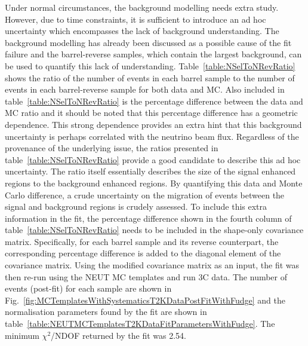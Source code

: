 \newline
\newline
Under normal circumstances, the background modelling needs extra study.  However, due to time constraints, it is sufficient to introduce an ad hoc uncertainty which encompasses the lack of background understanding.  The background modelling has already been discussed as a possible cause of the fit failure and the barrel-reverse samples, which contain the largest background, can be used to quantify this lack of understanding.  Table~\ref{table:NSelToNRevRatio} shows the ratio of the number of events in each barrel sample to the number of events in each barrel-reverse sample for both data and MC.  Also included in table~\ref{table:NSelToNRevRatio} is the percentage difference between the data and MC ratio and it should be noted that this percentage difference has a geometric dependence.  This strong dependence provides an extra hint that this background uncertainty is perhaps correlated with the neutrino beam flux.  Regardless of the provenance of the underlying issue, the ratios presented in table~\ref{table:NSelToNRevRatio} provide a good candidate to describe this ad hoc uncertainty.  The ratio itself essentially describes the size of the signal enhanced regions to the background enhanced regions.  By quantifying this data and Monte Carlo difference, a crude uncertainty on the migration of events between the signal and background regions is crudely assessed.  To include this extra information in the fit, the percentage difference shown in the fourth column of table~\ref{table:NSelToNRevRatio} needs to be included in the shape-only covariance matrix.  Specifically, for each barrel sample and its reverse counterpart, the corresponding percentage difference is added to the diagonal element of the covariance matrix.  Using the modified covariance matrix as an input, the fit was then re-run using the NEUT MC templates and run 3C data.  The number of events (post-fit) for each sample are shown in Fig.~\ref{fig:MCTemplatesWithSystematicsT2KDataPostFitWithFudge} and the normalisation parameters found by the fit are shown in table~\ref{table:NEUTMCTemplatesT2KDataFitParametersWithFudge}.  The minimum $\chi^2$/NDOF returned by the fit was 2.54.
